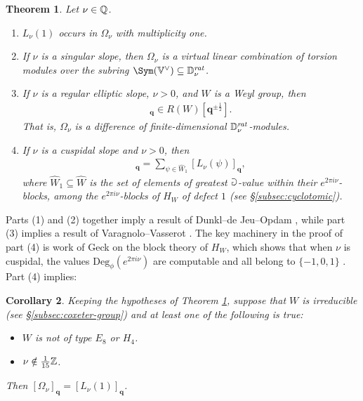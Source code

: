 \documentclass[a4paper,10pt,leqno]{amsart}
\theoremstyle{plain}
\newtheorem{mainthm}{Theorem}
\newtheorem{maincor}[mainthm]{Corollary}
\theoremstyle{plain}
\theoremstyle{plain}
\theoremstyle{definition}
\theoremstyle{remark}
\newcommand{\Q}{\bm{q}}
\newcommand{\UDeg}{\mathrm{Deg}}
\newcommand{\rat}{\mathit{rat}}
\newcommand{\slope}{\nu}
\begin{document}
\begin{mainthm}\label{thm:slopes}
Let $\slope \in \bb{Q}$.
\begin{enumerate}
\item 	$L_\slope(1)$ occurs in $\Omega_\slope$ with multiplicity one.
\item 	If $\slope$ is a singular slope, then $\Omega_\slope$ is a virtual linear combination of torsion modules over the subring $\Sym(\bb{V}^\vee) \subseteq \bb{D}_\slope^\rat$.
\item 	If $\slope$ is a regular elliptic slope, $\slope > 0$, and $W$ is a Weyl group, then 
		\begin{align}
		[\Omega_\slope]_{\Q} \in R(W)[\Q^{\pm\frac{1}{2}}].
		\end{align}
		That is, $\Omega_\slope$ is a difference of finite-dimensional $\bb{D}_\slope^\rat$-modules.
\item 	If $\slope$ is a cuspidal slope and $\slope > 0$, then
		\begin{align}
		[\Omega_\slope]_{\Q} = \sum_{\psi \in \hat{W}_1}
		{[L_\slope(\psi)]_{\Q}},
		\end{align}
		where $\hat{W}_1 \subseteq \hat{W}$ is the set of elements of greatest $\mathbb{a}$-value within their  $e^{2\pi i\slope}$-blocks, among the $e^{2\pi i\slope}$-blocks of $H_W$ of defect $1$ (see \S\ref{subsec:cyclotomic}).
\end{enumerate}
\end{mainthm}

Parts (1) and (2) together imply a result of Dunkl--de Jeu--Opdam \cite[Thm.\ 4.9(1)]{djo}, while part (3) implies a result of Varagnolo--Vasserot \cite[Thm.\ 2.8.1(a)]{vv}.
The key machinery in the proof of part (4) is work of Geck on the block theory of $H_W$, which shows that when $\slope$ is cuspidal, the values $\UDeg_\phi(e^{2\pi i\slope})$ are computable and all belong to $\{-1, 0, 1\}$ \cite{geck}.
Part (4) implies:

\begin{maincor}\label{cor:cuspidal}
Keeping the hypotheses of Theorem \ref{thm:slopes}, suppose that $W$ is irreducible (see \S\ref{subsec:coxeter-group}) and at least one of the following is true:
\begin{itemize}
\item 	$W$ is not of type $E_8$ or $H_4$.
\item 	$\slope \notin \frac{1}{15}\bb{Z}$.
\end{itemize}
Then $[\Omega_\slope]_{\Q} = [L_\slope(1)]_{\Q}$.
\end{maincor}
\end{document}
